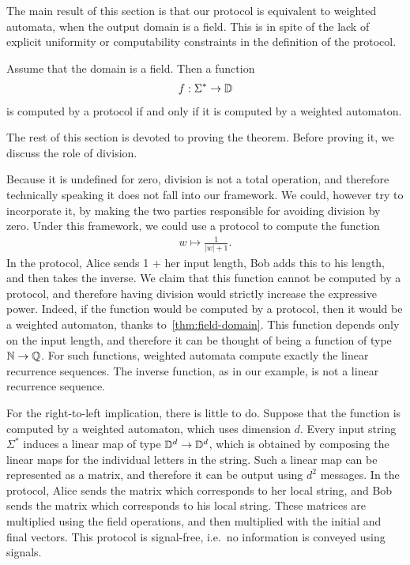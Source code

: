 The main result of this section is that our protocol is equivalent to weighted automata, when the output domain is a field. This is in spite of the lack of explicit uniformity or computability constraints in the definition of the protocol. 

\begin{theorem}\label{thm:field-domain}
    Assume that the domain is a field. Then a function 
    \begin{align*}
    f : \Sigma^* \to \mathbb D
    \end{align*}  is computed by a protocol if and only if it is  computed by a weighted automaton.
\end{theorem}

The rest of this section is devoted to proving the theorem. Before proving it, we discuss the role of division.

\begin{myexample}
    Because it is undefined for zero, division is not a total operation, and therefore technically speaking it does not fall into our framework. We could, however try to incorporate it, by making the two parties responsible for avoiding division by zero. Under this framework, we could use a protocol to compute the function 
    \begin{align*}
    w \mapsto \frac 1 {|w|+1}.
    \end{align*}
    In the protocol, Alice sends 1 + her input length, Bob adds this to his length, and then takes the inverse. We claim that this function cannot be computed by a protocol, and therefore having division would strictly increase the expressive power. Indeed, if the function would be computed by a protocol, then it would be a weighted automaton, thanks to~\cref{thm:field-domain}. This function depends only on the input length, and therefore it can be thought of being a function of type ${\mathbb N} \to {\mathbb Q}$. For such functions, weighted automata compute exactly the linear recurrence sequences. The inverse function, as in our example, is not a linear recurrence sequence.
\end{myexample}

For the right-to-left implication, there is little to do. Suppose that the function is computed by a weighted automaton, which uses  dimension $d$. Every input string $\Sigma^*$ induces a linear map of type $\mathbb D^d \to \mathbb D^d$, which is obtained by composing the linear maps for the individual letters in the string.  Such a linear map can be represented as a matrix, and therefore it can be output using $d^2$ messages.  In the protocol, Alice sends the matrix  which corresponds to her local string, and Bob sends the  matrix which corresponds to  his local string. These matrices are multiplied using the field operations, and then multiplied with the initial and final vectors. This protocol is signal-free, i.e.~no information is conveyed using signals.

